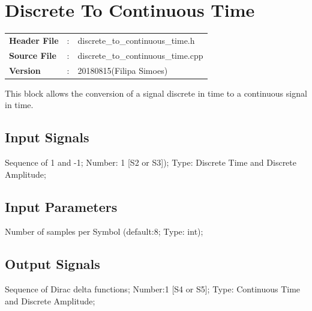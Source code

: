 \clearpage 

\section{Discrete To Continuous Time}

\begin{tcolorbox}	
	\begin{tabular}{p{2.75cm} p{0.2cm} p{10.5cm}} 	
		\textbf{Header File}   &:& discrete\_to\_continuous\_time.h \\
		\textbf{Source File}   &:& discrete\_to\_continuous\_time.cpp \\
		\textbf{Version}  &:& 20180815(Filipa Simoes) \\
	\end{tabular}
\end{tcolorbox}

This block allows the conversion of a signal discrete in time to a continuous signal in time.

\subsection*{Input Signals}
Sequence of 1 and -1;
Number: 1 [S2 or S3]);
Type: Discrete Time and Discrete Amplitude;

\subsection*{Input Parameters}

Number of samples per Symbol (default:8; Type: int);

\subsection*{Output Signals}
Sequence of Dirac delta functions;
Number:1 [S4 or S5];
Type: Continuous Time and Discrete Amplitude;




